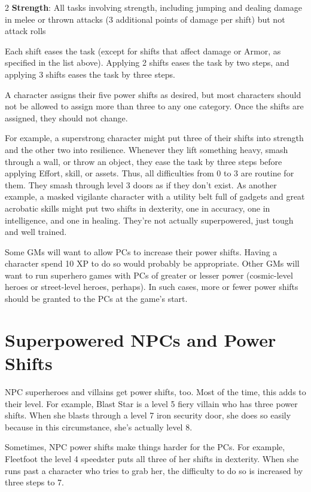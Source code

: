 \begin{multicols}{2}
\textbf{Strength}: All tasks involving strength, including jumping and dealing damage in melee or thrown attacks (3 additional points of damage per shift) but not attack rolls

Each shift eases the task (except for shifts that affect damage or Armor, as specified in the list above). Applying 2 shifts eases the task by two steps, and applying 3 shifts eases the task by three steps.

A character assigns their five power shifts as desired, but most characters should not be allowed to assign more than three to any one category. Once the shifts are assigned, they should not change.

For example, a superstrong character might put three of their shifts into strength and the other two into resilience. Whenever they lift something heavy, smash through a wall, or throw an object, they ease the task by three steps before applying Effort, skill, or assets. Thus, all difficulties from 0 to 3 are routine for them. They smash through level 3 doors as if they don’t exist. As another example, a masked vigilante character with a utility belt full of gadgets and great acrobatic skills might put two shifts in dexterity, one in accuracy, one in intelligence, and one in healing. They’re not actually superpowered, just tough and well trained.

Some GMs will want to allow PCs to increase their power shifts. Having a character spend 10 XP to do so would probably be appropriate. Other GMs will want to run superhero games with PCs of greater or lesser power (cosmic-level heroes or street-level heroes, perhaps). In such cases, more or fewer power shifts should be granted to the PCs at the game’s start.

\section{Superpowered NPCs and Power Shifts}

NPC superheroes and villains get power shifts, too. Most of the time, this adds to their level. For example, Blast Star is a level 5 fiery villain who has three power shifts. When she blasts through a level 7 iron security door, she does so easily because in this circumstance, she’s actually level 8.

Sometimes, NPC power shifts make things harder for the PCs. For example, Fleetfoot the level 4 speedster puts all three of her shifts in dexterity. When she runs past a character who tries to grab her, the difficulty to do so is increased by three steps to 7.


\end{multicols}
